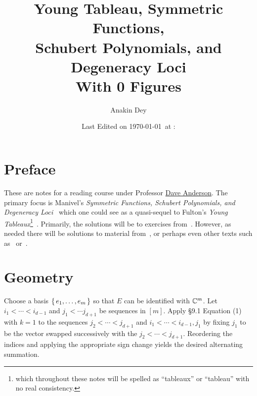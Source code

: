 \documentclass[letterpaper, 11pt, oneside]{book}
\title{\vspace{-100pt} {\Huge Young Tableau, Symmetric Functions, \protect\\ Schubert Polynomials, and Degeneracy Loci} \\ {\small With 0 Figures}}
\author{\Large Anakin Dey}
\date{\small Last Edited on \today\ at \DTMfetchhour{now}:\DTMfetchminute{now}}
\newcommand{\CoverName}{Cover}
\begin{document}
\frontmatter
\renewcommand{\thepage}{\CoverName}
\maketitle


\tableofcontents
\clearpage


%

\chapter*{Preface}

These are notes for a reading course under Professor \href{https://people.math.osu.edu/anderson.2804/index.html}{Dave Anderson}.
The primary focus is Manivel's \emph{Symmetric Functions, Schubert Polynomials, and Degeneracy Loci}~\cite{book:ManivelSFSPDL} which one could see as a quasi-sequel to Fulton's \emph{Young Tableaux}\footnote{which throughout these notes will be spelled as ``tableaux'' or ``tableau'' with no real consistency.}~\cite{book:YT}.
Primarily, the solutions will be to exercises from~\cite{book:ManivelSFSPDL}.
However, as needed there will be solutions to material from~\cite{book:YT}, or perhaps even other texts such as~\cite{book:MacdonaldSymmetricHall} or~\cite{book:ECII}.

\mainmatter

\chapter{\cite{book:YT} Geometry}

\begin{sol}\label{ex:YT_9.1.1}
  Choose a basis $\set{e_{1}, \ldots, e_{m}}$ so that $E$ can be identified with $\mathbb{C}^{m}$.
  Let $i_{1} < \cdots < i_{d - 1}$ and $j_{1} < \cdots j_{d + 1}$ be sequences in $[m]$.
  Apply \S 9.1 Equation (1) with $k = 1$ to the sequences $j_{2} < \cdots < j_{d + 1}$ and $i_{1} < \cdots < i_{d - 1}, j_{1}$ by fixing $j_{1}$ to be the vector swapped successively with the $j_{2} < \cdots < j_{d + 1}$.
  Reordering the indices and applying the appropriate sign change yields the desired alternating summation.
\end{sol}
\end{document}
